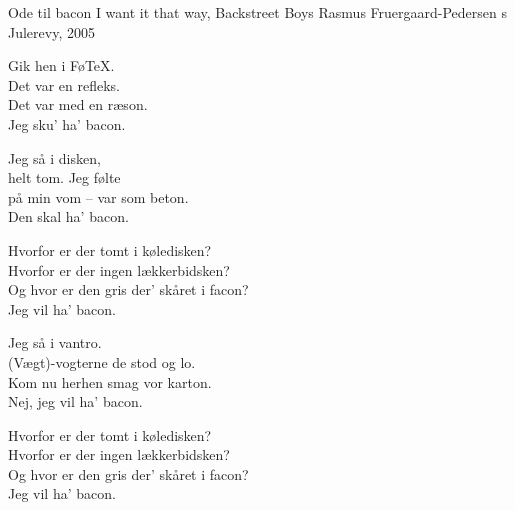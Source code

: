 \begin{song}{Ode til bacon}
  {} %
  {I want it that way, Backstreet Boys} %
  {Rasmus Fruergaard-Pedersen} %
  {\TKET{}s Julerevy, 2005} %
  {\NotCCLIed} %

  \begin{SBVerse}
    Gik hen i Fø\TeX.\\
    Det var en refleks.\\
    Det var med en ræson.\\
    Jeg sku’ ha’ bacon.
  \end{SBVerse}

  \begin{SBVerse}
    Jeg så i disken,\\
    helt tom. Jeg følte\\
    på min vom – var som beton.\\
    Den skal ha’ bacon.
  \end{SBVerse}

  \begin{SBChorus}
    Hvorfor er der tomt i køledisken?\\
    Hvorfor er der ingen lækkerbidsken?\\
    Og hvor er den gris der’ skåret i facon?\\
    Jeg vil ha’ bacon.
  \end{SBChorus}

  \begin{SBVerse}
    Jeg så i vantro.\\
    (Vægt)-vogterne de stod og lo.\\
    Kom nu herhen smag vor karton.\\
    Nej, jeg vil ha’ bacon.
  \end{SBVerse}

  \begin{SBChorus}
    Hvorfor er der tomt i køledisken?\\
    Hvorfor er der ingen lækkerbidsken?\\
    Og hvor er den gris der’ skåret i facon?\\
    Jeg vil ha’ bacon.
  \end{SBChorus}



\end{song}
